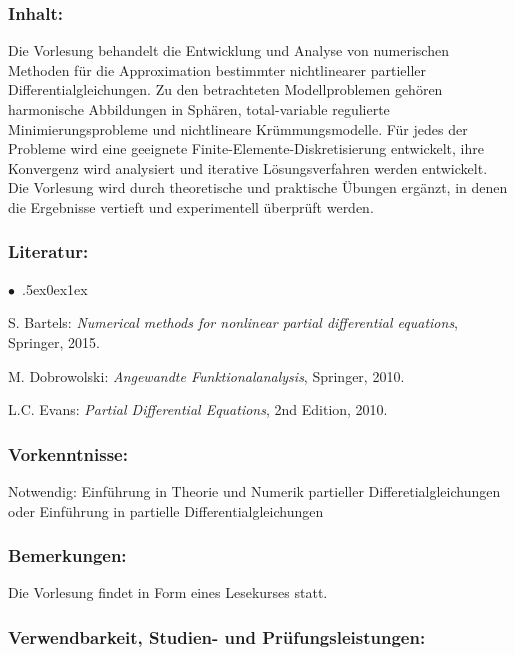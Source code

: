 \documentclass[a4paper,10pt]{article}
\renewenvironment{itemize}{\begin{list}{$\bullet$\ }{\itemsep.5ex\setlength{\topsep}{0.5\itemsep}\parsep0ex\labelsep1ex\settowidth{\labelwidth}{$\bullet$\ }\setlength{\leftmargin}{\labelwidth}\addtolength{\leftmargin}{3ex}\addtolength{\leftmargin}{\labelsep}}}{\end{list}}
\begin{document}
\subsubsection*{\large
    Inhalt:
}
Die Vorlesung behandelt die Entwicklung und Analyse von numerischen Methoden für die Approximation bestimmter nichtlinearer partieller Differentialgleichungen. Zu den betrachteten Modellproblemen gehören harmonische Abbildungen in Sphären, total-variable regulierte Minimierungsprobleme und nichtlineare Krümmungsmodelle. Für jedes der Probleme wird eine geeignete Finite-Elemente-Diskretisierung entwickelt, ihre Konvergenz wird analysiert und iterative Lösungsverfahren werden entwickelt. Die Vorlesung wird durch theoretische und praktische Übungen ergänzt, in denen die Ergebnisse vertieft und experimentell überprüft werden.
\subsubsection*{\large
    Literatur:
}
\begin{itemize}
\item
S. Bartels: \emph{Numerical methods for nonlinear partial differential equations}, Springer, 2015.
\item
M. Dobrowolski: \emph{Angewandte Funktionalanalysis}, Springer, 2010.
\item
L.C. Evans: \emph{Partial Differential Equations}, 2nd Edition, 2010. 
\end{itemize}
\subsubsection*{\large
    Vorkenntnisse:
}
Notwendig: Einführung in Theorie und Numerik partieller Differetialgleichungen oder Einführung in partielle Differentialgleichungen
\subsubsection*{\large
    Bemerkungen:
}
Die Vorlesung findet in Form eines Lesekurses statt.
\cleardoublepage
\subsubsection*{\large
    Verwendbarkeit, Studien- und Prüfungsleistungen:
}
\end{document}
